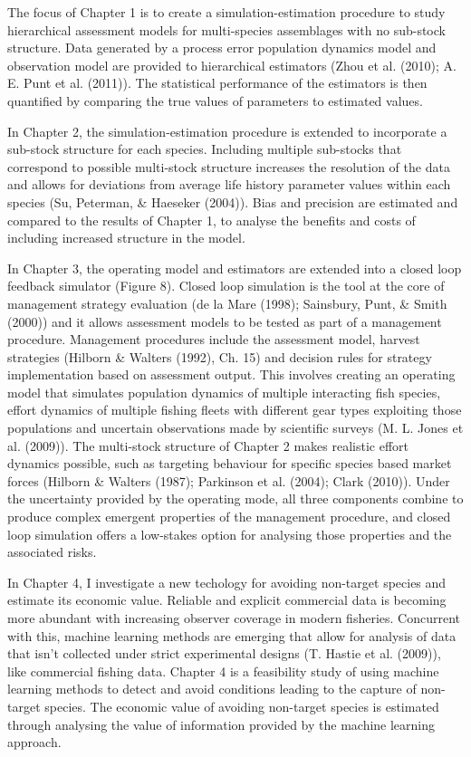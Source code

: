 \documentclass[12pt,]{scrartcl}
\begin{document}
The focus of Chapter 1 is to create a simulation-estimation procedure to
study hierarchical assessment models for multi-species assemblages with
no sub-stock structure. Data generated by a process error population
dynamics model and observation model are provided to hierarchical
estimators (Zhou et al. (2010); A. E. Punt et al. (2011)). The
statistical performance of the estimators is then quantified by
comparing the true values of parameters to estimated values.

In Chapter 2, the simulation-estimation procedure is extended to
incorporate a sub-stock structure for each species. Including multiple
sub-stocks that correspond to possible multi-stock structure increases
the resolution of the data and allows for deviations from average life
history parameter values within each species (Su, Peterman, \& Haeseker
(2004)). Bias and precision are estimated and compared to the results of
Chapter 1, to analyse the benefits and costs of including increased
structure in the model.

In Chapter 3, the operating model and estimators are extended into a
closed loop feedback simulator (Figure 8). Closed loop simulation is the
tool at the core of management strategy evaluation (de la Mare (1998);
Sainsbury, Punt, \& Smith (2000)) and it allows assessment models to be
tested as part of a management procedure. Management procedures include
the assessment model, harvest strategies (Hilborn \& Walters (1992), Ch.
15) and decision rules for strategy implementation based on assessment
output. This involves creating an operating model that simulates
population dynamics of multiple interacting fish species, effort
dynamics of multiple fishing fleets with different gear types exploiting
those populations and uncertain observations made by scientific surveys
(M. L. Jones et al. (2009)). The multi-stock structure of Chapter 2
makes realistic effort dynamics possible, such as targeting behaviour
for specific species based market forces (Hilborn \& Walters (1987);
Parkinson et al. (2004); Clark (2010)). Under the uncertainty provided
by the operating mode, all three components combine to produce complex
emergent properties of the management procedure, and closed loop
simulation offers a low-stakes option for analysing those properties and
the associated risks.

In Chapter 4, I investigate a new techology for avoiding non-target
species and estimate its economic value. Reliable and explicit
commercial data is becoming more abundant with increasing observer
coverage in modern fisheries. Concurrent with this, machine learning
methods are emerging that allow for analysis of data that isn't
collected under strict experimental designs (T. Hastie et al. (2009)),
like commercial fishing data. Chapter 4 is a feasibility study of using
machine learning methods to detect and avoid conditions leading to the
capture of non-target species. The economic value of avoiding non-target
species is estimated through analysing the value of information provided
by the machine learning approach.
\end{document}
